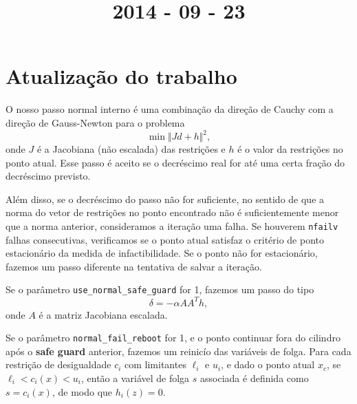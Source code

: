 \documentclass{article}
\title{2014 - 09 - 23}
\author{}
\date{}
\renewcommand{\emph}[1]{\textbf{#1}}
\newcommand{\norma}[1]{\Vert{#1}\Vert}
\begin{document}
\maketitle
\section{Atualização do trabalho}

O nosso passo normal interno é uma combinação da direção de Cauchy com a
direção de Gauss-Newton para o problema
$$ \min \norma{Jd + h}^2, $$
onde $J$ é a Jacobiana (não escalada) das restrições e $h$ é o valor da
restrições no ponto atual.
Esse passo é aceito se o decréscimo real for até uma certa fração do decréscimo
previsto.

Além disso, se o decréscimo do passo não for suficiente, no sentido de que a
norma do vetor de restrições no ponto encontrado não é suficientemente menor que
a norma anterior, consideramos a iteração uma falha. Se houverem \texttt{nfailv}
falhas consecutivas, verificamos se o ponto atual satisfaz o critério de
ponto estacionário da medida de infactibilidade. Se o ponto não for
estacionário, fazemos um passo diferente na tentativa de salvar a iteração.

Se o parâmetro \verb+use_normal_safe_guard+ for 1, fazemos um passo do tipo
$$ \delta = -\alpha AA^Th, $$
onde $A$ é a matriz Jacobiana escalada.

Se o parâmetro \verb+normal_fail_reboot+ for 1, e o ponto continuar fora do
cilindro após o \emph{safe guard} anterior, fazemos um reinicío das variáveis de
folga. Para cada restrição de desigualdade $c_i$ com limitantes $\ell_i$ e
$u_i$, e dado o ponto atual $x_c$, se $\ell_i < c_i(x) < u_i$, então a variável
de folga $s$ associada é definida como $s = c_i(x)$, de modo que $h_i(z) = 0$.
\end{document}
